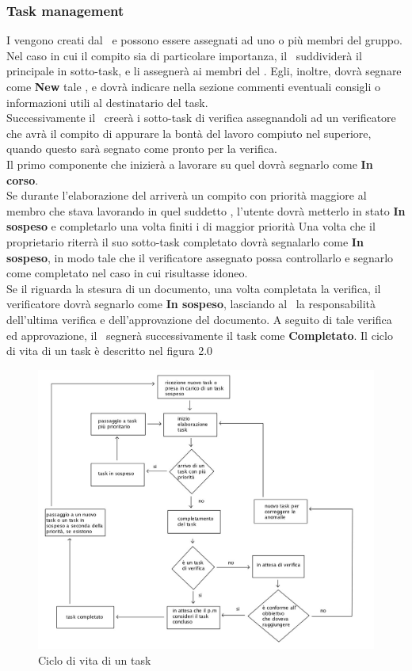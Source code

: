 \subsubsection{Task management}
I  vengono creati dal \Pm\ e possono essere assegnati ad uno o più membri del gruppo. Nel caso in cui il compito sia di particolare importanza, il \Pm\ suddividerà il  principale in sotto-task, e li assegnerà ai membri del . Egli, inoltre, dovrà segnare come \textbf{New} tale , e dovrà indicare nella sezione commenti eventuali consigli o informazioni utili al destinatario del task. \\
Successivamente il \Pm\ creerà i sotto-task di verifica assegnandoli ad un verificatore che avrà il compito di appurare la bontà del lavoro compiuto nel  superiore, quando questo sarà segnato come pronto per la verifica. \\
Il primo componente che inizierà a lavorare su quel  dovrà segnarlo come \textbf{In corso}. \\
Se durante l'elaborazione del  arriverà un compito con priorità maggiore al membro che stava lavorando in quel suddetto , l'utente dovrà metterlo in stato \textbf{In sospeso} e completarlo una volta finiti i  di maggior priorità
Una volta che il proprietario riterrà il suo sotto-task completato dovrà segnalarlo come \textbf{In sospeso}, in modo tale che il verificatore assegnato possa controllarlo e segnarlo come completato nel caso in cui risultasse idoneo. \\
Se il  riguarda la stesura di un documento, una volta completata la verifica, il verificatore dovrà segnarlo come \textbf{In sospeso}, lasciando al \Pm\ la responsabilità dell'ultima verifica e dell'approvazione del documento. A seguito di tale verifica ed approvazione, il \Pm\ segnerà successivamente il task come \textbf{Completato}.
Il ciclo di vita di un task è descritto nel figura 2.0
\label{figura 2.0}
\begin{figure}[ht]
	\centering
	\includegraphics[scale=0.8]{lavorazione_task.jpg}
	\caption{Ciclo di vita di un task}
\end{figure}



